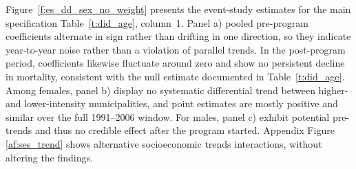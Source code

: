 \documentclass[12pt]{article}
\begin{document}
\p Figure~\ref{f:es_dd_sex_no_weight} presents the event-study estimates for the main specification Table~\ref{t:did_age}, column~1. Panel a) pooled pre-program coefficients alternate in sign rather than drifting in one direction, so they indicate year-to-year noise rather than a violation of parallel trends. In the post-program period, coefficients likewise fluctuate around zero and show no persistent decline in mortality, consistent with the null estimate documented in Table~\ref{t:did_age}. Among females, panel b) display no systematic differential trend between higher- and lower-intensity municipalities, and point estimates are mostly positive and similar over the full 1991--2006 window. For males, panel c) exhibit potential pre-trends and thus no credible effect after the program started. Appendix Figure \ref{af:ses_trend} shows alternative socioeconomic trends interactions, without altering the findings.
\end{document}
